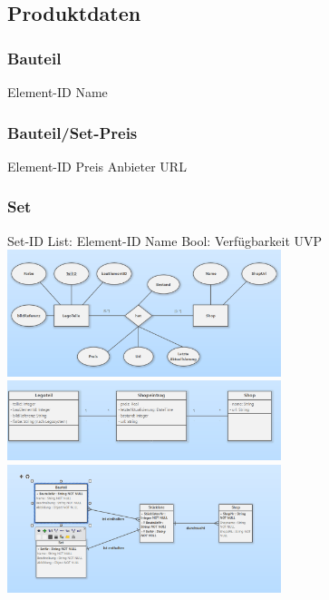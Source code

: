 \subsection{Produktdaten}

\subsubsection{Bauteil}
Element-ID\newline
Name \newline

\subsubsection{Bauteil/Set-Preis}
Element-ID\newline
Preis\newline
Anbieter\newline
URL\newline

\subsubsection{Set}
Set-ID \newline
List: Element-ID \newline
Name \newline
Bool: Verfügbarkeit \newline
UVP \newline  \newline
\includegraphics[width=8cm]{pictures/chen1.png} \newline  \newline
\includegraphics[width=8cm]{pictures/klassendiagramm2.png}  \newline  \newline
\includegraphics[width=8cm]{pictures/klassendiagramm.png} 

